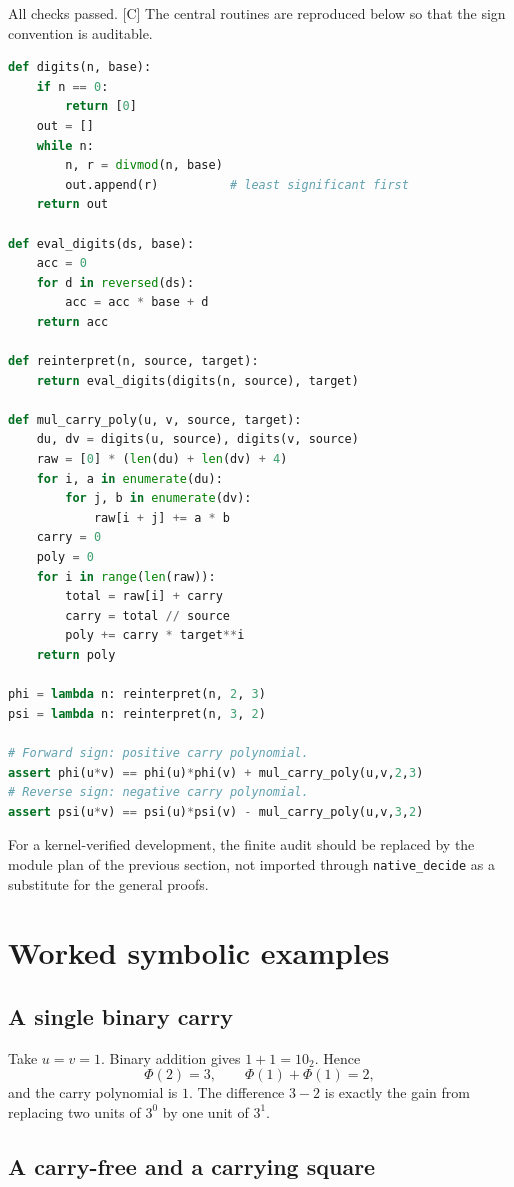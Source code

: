 \documentclass[11pt]{article}
\theoremstyle{definition}
\theoremstyle{remark}
\newcommand{\PhiMap}{\Phi}
\newcommand{\evidence}[1]{\textsf{[#1]}}
\begin{document}
All checks passed. \evidence{C}  The central routines are reproduced below so
that the sign convention is auditable.

\begin{lstlisting}[language=Python]
def digits(n, base):
    if n == 0:
        return [0]
    out = []
    while n:
        n, r = divmod(n, base)
        out.append(r)          # least significant first
    return out

def eval_digits(ds, base):
    acc = 0
    for d in reversed(ds):
        acc = acc * base + d
    return acc

def reinterpret(n, source, target):
    return eval_digits(digits(n, source), target)

def mul_carry_poly(u, v, source, target):
    du, dv = digits(u, source), digits(v, source)
    raw = [0] * (len(du) + len(dv) + 4)
    for i, a in enumerate(du):
        for j, b in enumerate(dv):
            raw[i + j] += a * b
    carry = 0
    poly = 0
    for i in range(len(raw)):
        total = raw[i] + carry
        carry = total // source
        poly += carry * target**i
    return poly

phi = lambda n: reinterpret(n, 2, 3)
psi = lambda n: reinterpret(n, 3, 2)

# Forward sign: positive carry polynomial.
assert phi(u*v) == phi(u)*phi(v) + mul_carry_poly(u,v,2,3)
# Reverse sign: negative carry polynomial.
assert psi(u*v) == psi(u)*psi(v) - mul_carry_poly(u,v,3,2)
\end{lstlisting}

For a kernel-verified development, the finite audit should be replaced by the
module plan of the previous section, not imported through \texttt{native\_decide} as a
substitute for the general proofs.

\section{Worked symbolic examples}

\subsection{A single binary carry}

Take $u=v=1$.  Binary addition gives $1+1=10_2$.  Hence
\[
 \PhiMap(2)=3,
 \qquad \PhiMap(1)+\PhiMap(1)=2,
\]
and the carry polynomial is $1$.  The difference $3-2$ is exactly the gain
from replacing two units of $3^0$ by one unit of $3^1$.

\subsection{A carry-free and a carrying square}
\end{document}
